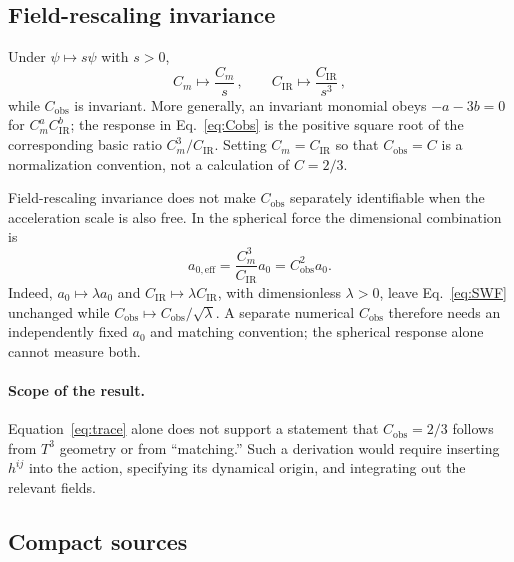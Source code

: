 \documentclass[aps,prd,reprint,superscriptaddress,nofootinbib,floatfix,showkeys]{revtex4-2}
\newcommand{\Tthree}{T^{3}}
\newcommand{\Cobs}{C_{\mathrm{obs}}}
\newcommand{\Cm}{C_{m}}
\newcommand{\CIR}{C_{\mathrm{IR}}}
\newcommand{\azero}{a_{0}}
\begin{document}
\subsection{Field-rescaling invariance}

Under \(\psi\mapsto s\psi\) with \(s>0\),
\begin{equation}
  \Cm\mapsto\frac{\Cm}{s}\,,
  \qquad
  \CIR\mapsto\frac{\CIR}{s^{3}}\,,
  \label{eq:rescale}
\end{equation}
while \(\Cobs\) is invariant.  More generally, an invariant monomial obeys
\(-a-3b=0\) for \(\Cm^a\CIR^b\); the response in
Eq.~\eqref{eq:Cobs} is the positive square root of the corresponding basic
ratio \(\Cm^3/\CIR\).  Setting \(\Cm=\CIR\) so that \(\Cobs=C\) is a
normalization convention, not a calculation of \(C=2/3\).

Field-rescaling invariance does not make \(\Cobs\) separately identifiable
when the acceleration scale is also free. In the spherical force the
dimensional combination is
\begin{equation}
 a_{0,\mathrm{eff}}=\frac{\Cm^3}{\CIR}\azero=\Cobs^2\azero.
 \label{eq:identifiable-scale}
\end{equation}
Indeed, \(\azero\mapsto\lambda\azero\) and
\(\CIR\mapsto\lambda\CIR\), with dimensionless \(\lambda>0\), leave
Eq.~\eqref{eq:SWF} unchanged while
\(\Cobs\mapsto\Cobs/\sqrt{\lambda}\). A separate numerical \(\Cobs\)
therefore needs an independently fixed \(\azero\) and matching convention;
the spherical response alone cannot measure both.

\paragraph{Scope of the result.}
Equation~\eqref{eq:trace} alone does not support a statement that
\(\Cobs=2/3\) follows from \(\Tthree\) geometry or from ``matching.''  Such a
derivation would require inserting \(h^{ij}\) into the action, specifying its
dynamical origin, and integrating out the relevant fields.

\subsection{Compact sources}
\end{document}
